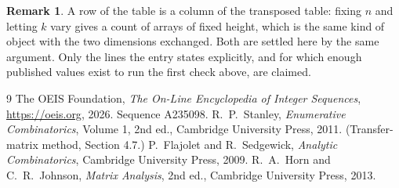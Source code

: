 \documentclass[11pt,a4paper]{article}
\theoremstyle{plain}
\theoremstyle{definition}
\newtheorem{remark}[theorem]{Remark}
\begin{document}
\begin{remark}
A row of the table is a column of the transposed table: fixing $n$ and letting $k$ vary gives a
count of arrays of fixed height, which is the same kind of object with the two dimensions
exchanged. Both are settled here by the same argument. Only the lines the entry states
explicitly, and for which enough published values exist to run the first check above, are
claimed.
\end{remark}

\begin{thebibliography}{9}
 The OEIS Foundation, \emph{The On-Line Encyclopedia of Integer
Sequences}, \url{https://oeis.org}, 2026. Sequence A235098.
 R.~P.~Stanley, \emph{Enumerative Combinatorics}, Volume 1, 2nd ed.,
Cambridge University Press, 2011. (Transfer-matrix method, Section 4.7.)
 P.~Flajolet and R.~Sedgewick, \emph{Analytic Combinatorics}, Cambridge
University Press, 2009.
 R.~A.~Horn and C.~R.~Johnson, \emph{Matrix Analysis}, 2nd ed., Cambridge
University Press, 2013.
\end{thebibliography}
\end{document}
